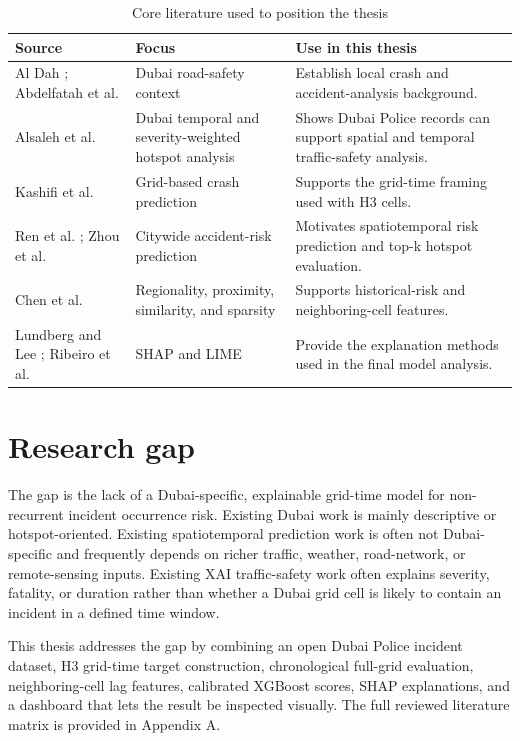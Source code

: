 \begin{table}[H]
\centering
\caption{Core literature used to position the thesis}
\label{tab:core_literature_summary}
\small
\begin{tabularx}{\textwidth}{L{0.22\textwidth}L{0.25\textwidth}Y}
\toprule
\textbf{Source} & \textbf{Focus} & \textbf{Use in this thesis} \\
\midrule
Al Dah \cite{aldah2010dubai}; Abdelfatah et al. \cite{abdelfatah2015dubai} & Dubai road-safety context & Establish local crash and accident-analysis background. \\
Alsaleh et al. \cite{alsaleh2026dubaihotspots} & Dubai temporal and severity-weighted hotspot analysis & Shows Dubai Police records can support spatial and temporal traffic-safety analysis. \\
Kashifi et al. \cite{kashifi2022grid} & Grid-based crash prediction & Supports the grid-time framing used with H3 cells. \\
Ren et al. \cite{ren2017citywide}; Zhou et al. \cite{zhou2020riskoracle} & Citywide accident-risk prediction & Motivates spatiotemporal risk prediction and top-k hotspot evaluation. \\
Chen et al. \cite{chen2024urbanrisk} & Regionality, proximity, similarity, and sparsity & Supports historical-risk and neighboring-cell features. \\
Lundberg and Lee \cite{lundberg2017shap}; Ribeiro et al. \cite{ribeiro2016lime} & SHAP and LIME & Provide the explanation methods used in the final model analysis. \\
\bottomrule
\end{tabularx}
\end{table}

\section{Research gap}

The gap is the lack of a Dubai-specific, explainable grid-time model for non-recurrent incident occurrence risk. Existing Dubai work is mainly descriptive or hotspot-oriented. Existing spatiotemporal prediction work is often not Dubai-specific and frequently depends on richer traffic, weather, road-network, or remote-sensing inputs. Existing XAI traffic-safety work often explains severity, fatality, or duration rather than whether a Dubai grid cell is likely to contain an incident in a defined time window.

This thesis addresses the gap by combining an open Dubai Police incident dataset, H3 grid-time target construction, chronological full-grid evaluation, neighboring-cell lag features, calibrated XGBoost scores, SHAP explanations, and a dashboard that lets the result be inspected visually. The full reviewed literature matrix is provided in Appendix A.
